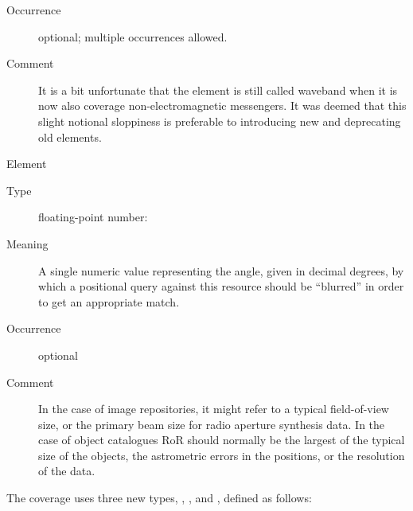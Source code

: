 \documentclass[11pt,a4paper]{ivoa}
\begin{document}
\begin{generated}
\begin{bigdescription}
\begin{description}
\item[Occurrence] optional; multiple occurrences allowed.
\item[Comment] 
                  It is a bit unfortunate that the element is still called
                  waveband when it is now also coverage non-electromagnetic
                  messengers.  It was deemed that this slight notional
                  sloppiness is preferable to introducing new and
                  deprecating old elements.
               

\end{description}
\item[Element \xmlel{regionOfRegard}]
\begin{description}
\item[Type] floating-point number: 
\item[Meaning] 
                  A single numeric value representing the angle, given
                  in decimal degrees, by which a positional query
                  against this resource should be “blurred” in order
                  to get an appropriate match. 
               
\item[Occurrence] optional
\item[Comment] 
                  In the case of image repositories, it might refer to
                  a typical field-of-view size, or the primary beam
                  size for radio aperture synthesis data.  In the case
                  of object catalogues RoR should normally be the
                  largest of the typical size of the objects, the
                  astrometric errors in the positions, or the
                  resolution of the data.  
               

\end{description}


\end{bigdescription}\endgroup

\endgroup
\end{generated}


The coverage uses three new types, ,
, and , defined as
follows:
\end{document}
